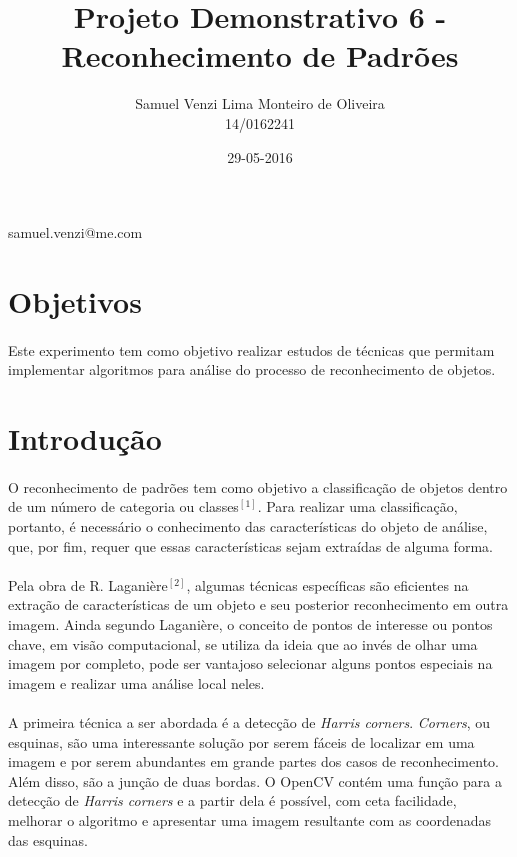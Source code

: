 \documentclass[conference, harvard, brazil, english]{sbatex}
\begin{document}
	\title{Projeto Demonstrativo 6 - Reconhecimento de Padrões}
	\date{29-05-2016}
	\author{Samuel Venzi Lima Monteiro de Oliveira\\14/0162241}{samuel.venzi@me.com}
	\address{SQN 208\\Brasília\\Brasil}
	
	
	\section{Objetivos}
		\paragraph{}
		Este experimento tem como objetivo realizar estudos de técnicas que permitam implementar algoritmos para análise do processo de reconhecimento de objetos.
		
	\section{Introdução}
		\paragraph{}
		O reconhecimento de padrões tem como objetivo a classificação de objetos dentro de um número de categoria ou classes$^{[1]}$. Para realizar uma classificação, portanto, é necessário o conhecimento das características do objeto de análise, que, por fim, requer que essas características sejam extraídas de alguma forma.
		\paragraph{}
		Pela obra de R. Laganière$ ^{[2]} $, algumas técnicas específicas são eficientes na extração de características de um objeto e seu posterior reconhecimento em outra imagem. Ainda segundo Laganière, o conceito de pontos de interesse ou pontos chave, em visão computacional, se utiliza da ideia que ao invés de olhar uma imagem por completo, pode ser vantajoso selecionar alguns pontos especiais na imagem e realizar uma análise local neles.
		\paragraph{}
		A primeira técnica a ser abordada é a detecção de \textit{Harris corners}. \textit{Corners}, ou esquinas, são uma interessante solução por serem fáceis de localizar em uma imagem e por serem abundantes em grande partes dos casos de reconhecimento. Além disso, são a junção de duas bordas. O OpenCV contém uma função para a detecção de \textit{Harris corners} e a partir dela é possível, com ceta facilidade, melhorar o algoritmo e apresentar uma imagem resultante com as coordenadas das esquinas.
\end{document}
